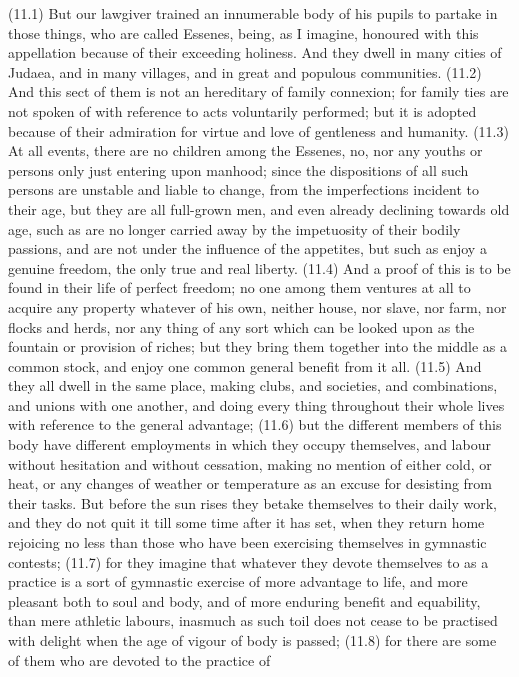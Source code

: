(11.1) But our lawgiver trained an innumerable body of his pupils to partake in those things, who are
called Essenes, being, as I imagine, honoured with this appellation because of their exceeding holiness.
And they dwell in many cities of Judaea, and in many villages, and in great and populous communities.
(11.2) And this sect of them is not an hereditary of family connexion; for family ties are not spoken of
with reference to acts voluntarily performed; but it is adopted because of their admiration for virtue and
love of gentleness and humanity. (11.3) At all events, there are no children among the Essenes, no, nor
any youths or persons only just entering upon manhood; since the dispositions of all such persons are
unstable and liable to change, from the imperfections incident to their age, but they are all full-grown
men, and even already declining towards old age, such as are no longer carried away by the
impetuosity of their bodily passions, and are not under the influence of the appetites, but such as enjoy
a genuine freedom, the only true and real liberty. (11.4) And a proof of this is to be found in their life of
perfect freedom; no one among them ventures at all to acquire any property whatever of his own,
neither house, nor slave, nor farm, nor flocks and herds, nor any thing of any sort which can be looked
upon as the fountain or provision of riches; but they bring them together into the middle as a common
stock, and enjoy one common general benefit from it all. (11.5) And they all dwell in the same place,
making clubs, and societies, and combinations, and unions with one another, and doing every thing
throughout their whole lives with reference to the general advantage; (11.6) but the different members
of this body have different employments in which they occupy themselves, and labour without hesitation
and without cessation, making no mention of either cold, or heat, or any changes of weather or
temperature as an excuse for desisting from their tasks. But before the sun rises they betake themselves
to their daily work, and they do not quit it till some time after it has set, when they return home rejoicing
no less than those who have been exercising themselves in gymnastic contests; (11.7) for they imagine
that whatever they devote themselves to as a practice is a sort of gymnastic exercise of more advantage
to life, and more pleasant both to soul and body, and of more enduring benefit and equability, than
mere athletic labours, inasmuch as such toil does not cease to be practised with delight when the age of
vigour of body is passed; (11.8) for there are some of them who are devoted to the practice of
